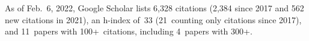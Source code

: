 %
As of Feb.~6, 2022, Google Scholar lists
6,328 citations (2,384 since 2017 and 562 new citations in 2021),
an h-index of~33 (21~counting only citations since 2017),
and 11~papers with 100+~citations, including 4~papers with 300+.
